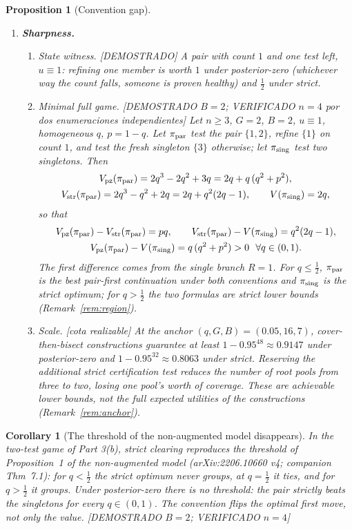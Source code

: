 \documentclass[11pt]{article}
\newtheorem{proposition}{Proposition}
\newtheorem{corollary}{Corollary}
\theoremstyle{remark}
\newcommand{\pz}{\mathrm{pz}}
\newcommand{\str}{\mathrm{str}}
\newcommand{\lab}[1]{\textcolor{blue!60!black}{\textsf{\small [#1]}}}
\begin{document}
\begin{proposition}[Convention gap]
\begin{enumerate}
\item[\textbf{3.}] \textbf{Sharpness.}
\begin{enumerate}
\item[(a)] \emph{State witness.} \lab{DEMOSTRADO} A pair with count $1$ and one test left, $u\equiv1$: refining one member is worth $1$ under posterior-zero (whichever way the count falls, someone is proven healthy) and $\tfrac12$ under strict.
\item[(b)] \emph{Minimal full game.} \lab{DEMOSTRADO $B=2$; VERIFICADO $n=4$ por dos enumeraciones independientes} Let $n\ge3$, $G=2$, $B=2$, $u\equiv1$, homogeneous $q$, $p=1-q$. Let $\pi_{\rm par}$ test the pair $\{1,2\}$, refine $\{1\}$ on count $1$, and test the fresh singleton $\{3\}$ otherwise; let $\pi_{\rm sing}$ test two singletons. Then
\begin{gather*}
V_\pz(\pi_{\rm par}) = 2q^3-2q^2+3q = 2q + q\,(q^2+p^2),\\
V_\str(\pi_{\rm par}) = 2q^3-q^2+2q = 2q + q^2(2q-1),\qquad
V(\pi_{\rm sing}) = 2q,
\end{gather*}
so that
\begin{gather*}
V_\pz(\pi_{\rm par})-V_\str(\pi_{\rm par}) = pq,\qquad
V_\str(\pi_{\rm par})-V(\pi_{\rm sing}) = q^2(2q-1),\\
V_\pz(\pi_{\rm par})-V(\pi_{\rm sing}) = q\,(q^2+p^2)>0\ \ \forall q\in(0,1).
\end{gather*}
The first difference comes from the single branch $R=1$. For $q\le\tfrac12$, $\pi_{\rm par}$ is the best pair-first continuation under both conventions and $\pi_{\rm sing}$ is the strict optimum; for $q>\tfrac12$ the two formulas are strict lower bounds (Remark~\ref{rem:region}).
\item[(c)] \emph{Scale.} \lab{cota realizable} At the anchor $(q,G,B)=(0.05,16,7)$, cover-then-bisect constructions guarantee at least $1-0.95^{48}\approx0.9147$ under posterior-zero and $1-0.95^{32}\approx0.8063$ under strict. Reserving the additional strict certification test reduces the number of root pools from three to two, losing one pool's worth of coverage. These are achievable lower bounds, not the full expected utilities of the constructions (Remark~\ref{rem:anchor}).
\end{enumerate}
\end{enumerate}
\end{proposition}

\begin{corollary}[The threshold of the non-augmented model disappears]\label{cor:threshold}
In the two-test game of Part 3(b), strict clearing reproduces the threshold of Proposition~1 of the non-augmented model (arXiv:2206.10660 v4; companion Thm~7.1): for $q<\tfrac12$ the strict optimum never groups, at $q=\tfrac12$ it ties, and for $q>\tfrac12$ it groups. Under posterior-zero there is no threshold: the pair strictly beats the singletons for every $q\in(0,1)$. The convention flips the optimal first move, not only the value. \lab{DEMOSTRADO $B=2$; VERIFICADO $n=4$}
\end{corollary}
\end{document}

